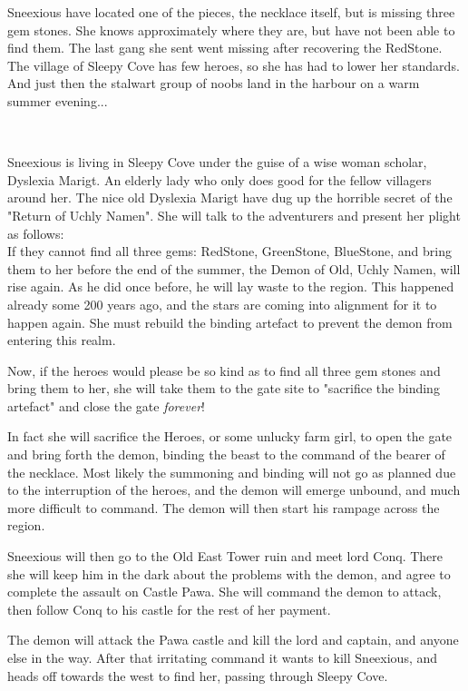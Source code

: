 \documentclass[11pt, twoside, titlepage, a4paper]{report}
\begin{document}
Sneexious have located one of the pieces, the necklace itself, but is missing three gem stones. She knows approximately where they are, but have not been able to find them. The last gang she sent went missing after recovering the RedStone. The village of Sleepy Cove has few heroes, so she has had to lower her standards. And just then the stalwart group of noobs land in the harbour on a warm summer evening...

\

Sneexious is living in Sleepy Cove under the guise of a wise woman scholar, Dyslexia Marigt. An elderly lady who only does good for the fellow villagers around her. The nice old Dyslexia Marigt have dug up the horrible secret of the "Return of Uchly Namen". She will talk to the adventurers and present her plight as follows: \\
If they cannot find all three gems: RedStone, GreenStone, BlueStone, and bring them to her before the end of the summer, the Demon of Old, Uchly Namen, will rise again. As he did once before, he will lay waste to the region. This happened already some 200 years ago, and the stars are coming into alignment for it to happen again. She must rebuild the binding artefact to prevent the demon from entering this realm.

Now, if the heroes would please be so kind as to find all three gem stones and bring them to her, she will take them to the gate site to "sacrifice the binding artefact" and close the gate \emph{forever}!

In fact she will sacrifice the Heroes, or some unlucky farm girl, to open the gate and bring forth the demon, binding the beast to the command of the bearer of the necklace.
Most likely the summoning and binding will not go as planned due to the interruption of the heroes, and the demon will emerge unbound, and much more difficult to command. The demon will then start his rampage across the region.

Sneexious will then go to the Old East Tower ruin and meet lord Conq. There she will keep him in the dark about the problems with the demon, and agree to complete the assault on Castle Pawa. She will command the demon to attack, then follow Conq to his castle for the rest of her payment.

The demon will attack the Pawa castle and kill the lord and captain, and anyone else in the way. After that irritating command it wants to kill Sneexious, and heads off towards the west to find her, passing through Sleepy Cove.
\end{document}
